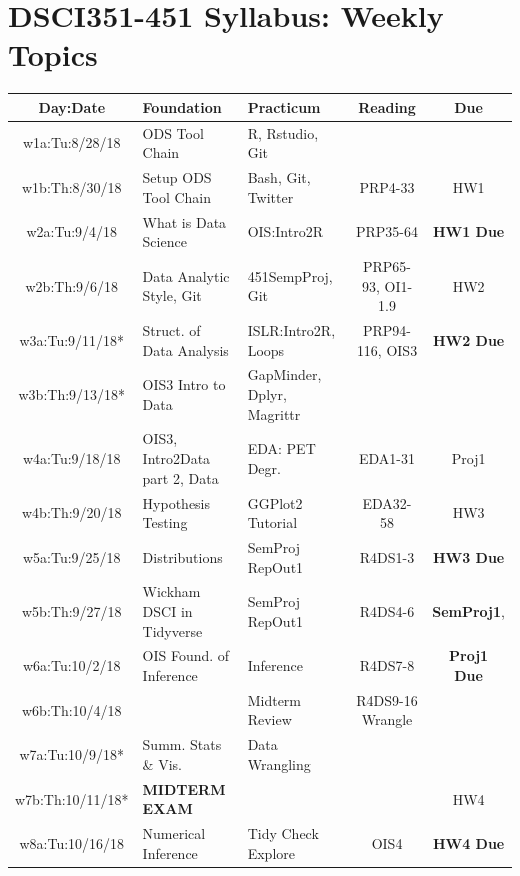 \documentclass[11pt]{article} %
\begin{document}
\section{DSCI351-451 Syllabus: Weekly Topics}
\begin{table}[h] 
	\centering %
	\begin{tabular}{| c | p{3.4cm} | p{3.4cm} | c | c |} %
	\hline %
	Day:Date & Foundation & Practicum  & Reading & Due  \\ %
	\hline 
	\hline %
  w1a:Tu:8/28/18 & ODS Tool Chain & R, Rstudio, Git & & \\ %
	\hline %
	w1b:Th:8/30/18 & Setup ODS Tool Chain & Bash, Git, Twitter & PRP4-33 & HW1 \\ 
	\hline  
	\hline
	w2a:Tu:9/4/18 & What is Data Science & OIS:Intro2R  & PRP35-64 & {\bf HW1 Due} \\ 
	\hline
	w2b:Th:9/6/18 &  Data Analytic Style, Git & 451SempProj, Git & PRP65-93, OI1-1.9 & HW2 \\
	\hline 
	\hline
	w3a:Tu:9/11/18* & Struct. of Data Analysis & ISLR:Intro2R, Loops & PRP94-116, OIS3 & {\bf HW2 Due}\\ 
	\hline
	w3b:Th:9/13/18* & OIS3 Intro to Data & GapMinder, Dplyr, Magrittr &  &  \\
	\hline
	\hline 
	w4a:Tu:9/18/18 & OIS3, Intro2Data part 2, Data & EDA: PET Degr. & EDA1-31 & Proj1  \\ 
	\hline
	w4b:Th:9/20/18 & Hypothesis Testing & GGPlot2 Tutorial & EDA32-58 & HW3 \\
	\hline
	\hline 
	w5a:Tu:9/25/18 & Distributions & SemProj RepOut1  & R4DS1-3 &  {\bf HW3 Due} \\ 
	\hline
	w5b:Th:9/27/18 & Wickham DSCI in Tidyverse & SemProj RepOut1 & R4DS4-6  & {\bf SemProj1}, \\
	\hline
	\hline 
	w6a:Tu:10/2/18 & OIS Found. of Inference & Inference  & R4DS7-8 & {\bf Proj1 Due} \\ 
	\hline
	w6b:Th:10/4/18 &  & Midterm Review & R4DS9-16 Wrangle & \\
	\hline
	\hline 
	w7a:Tu:10/9/18* & Summ. Stats \& Vis.  & Data Wrangling &  & \\ 
	\hline
	w7b:Th:10/11/18* & {\bf MIDTERM EXAM} &  &  & HW4 \\
	\hline
	\hline 
	w8a:Tu:10/16/18 & Numerical Inference &  Tidy Check Explore  & OIS4 & {\bf HW4 Due}\\ 

\end{tabular}
\end{table}
\end{document}
